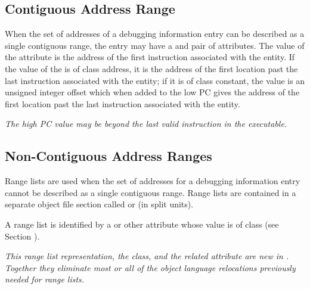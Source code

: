 \subsection{Contiguous Address Range}
\label{chap:contiguousaddressranges}
When the set of addresses of a debugging information entry can
be described as a single contiguous range, the entry may
have a \DWATlowpc{} and \DWAThighpc{} pair of attributes. 
The value of the \DWATlowpc{} attribute is the address of the
first instruction associated with the entity. If the value of
the \DWAThighpc{} is of class address, it is the 
address of the first location past the last instruction
associated with the entity; if it is of class constant, the
value is an unsigned integer offset which when added to the
low PC gives the address of the first location past the last
instruction associated with the entity.

\textit{The high PC value
may be beyond the last valid instruction in the executable.}

\subsection{Non-Contiguous Address Ranges}
\label{chap:noncontiguousaddressranges}
Range lists are used when the set of addresses for a debugging
information entry cannot be described as a single contiguous 
range.
Range lists are contained in a separate object file section
called \dotdebugrnglists{} or \dotdebugrnglistsdwo{} (in split units).
 
A range list is identified by a \DWATranges{} 
or other attribute whose value is of class \CLASSrnglist{} 
(see Section ).
 
\textit{This range list representation, the \CLASSrnglist{} class, and the
related \DWATrnglistsbase{} attribute are new in \DWARFVersionV.
Together they eliminate most or all of the object language relocations
previously needed for range lists.}

